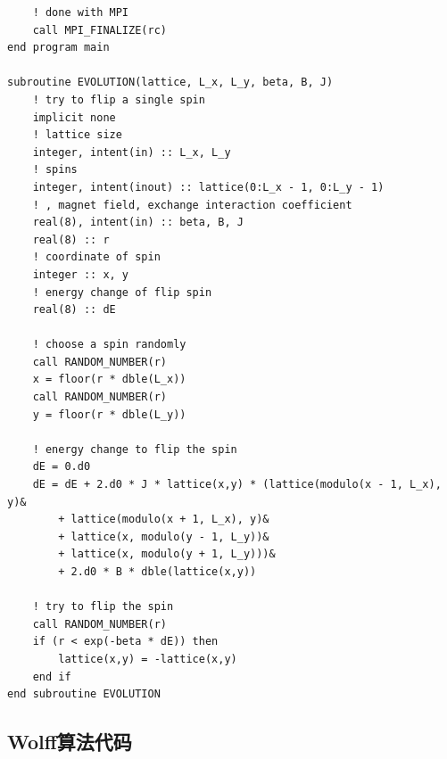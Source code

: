 \documentclass[UTF8,10pt,a4paper]{article}
\theoremstyle{Problem}
\theoremstyle{Solution}
\begin{document}
\begin{lstlisting}
    ! done with MPI
    call MPI_FINALIZE(rc)
end program main

subroutine EVOLUTION(lattice, L_x, L_y, beta, B, J)
    ! try to flip a single spin
    implicit none
    ! lattice size
    integer, intent(in) :: L_x, L_y
    ! spins
    integer, intent(inout) :: lattice(0:L_x - 1, 0:L_y - 1)
    ! , magnet field, exchange interaction coefficient
    real(8), intent(in) :: beta, B, J
    real(8) :: r
    ! coordinate of spin
    integer :: x, y
    ! energy change of flip spin
    real(8) :: dE

    ! choose a spin randomly
    call RANDOM_NUMBER(r)
    x = floor(r * dble(L_x))
    call RANDOM_NUMBER(r)
    y = floor(r * dble(L_y))

    ! energy change to flip the spin
    dE = 0.d0
    dE = dE + 2.d0 * J * lattice(x,y) * (lattice(modulo(x - 1, L_x), y)&
        + lattice(modulo(x + 1, L_x), y)&
        + lattice(x, modulo(y - 1, L_y))&
        + lattice(x, modulo(y + 1, L_y)))&
        + 2.d0 * B * dble(lattice(x,y))

    ! try to flip the spin
    call RANDOM_NUMBER(r)
    if (r < exp(-beta * dE)) then
        lattice(x,y) = -lattice(x,y)
    end if
end subroutine EVOLUTION
\end{lstlisting}

\subsection{Wolff算法代码}
\end{document}
